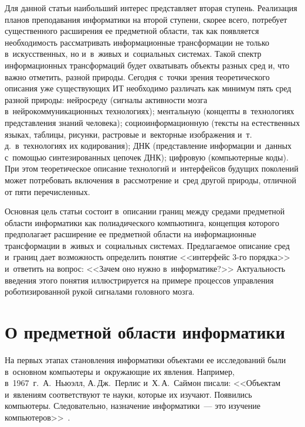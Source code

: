 \begin{multicols}{2}
  Для данной статьи наибольший интерес представляет вторая ступень. 
Реализация планов преподавания информатики на второй ступени, скорее 
всего, потребует существенного расширения ее предметной области, так как 
появляется необходимость рассматривать информационные трансформации не 
только в~искусственных, но и~в~живых и~социальных системах. Такой спектр 
информационных трансформаций будет охватывать объекты разных сред и, что 
важно отметить, разной природы. Сегодня с~точки зрения теоретического 
описания уже существующих ИТ необходимо 
различать как минимум пять сред разной природы: нейросреду (сигналы 
активности мозга в~нейрокоммуникационных технологиях); ментальную 
(концепты в~технологиях пред\-став\-ле\-ния знаний человека); 
социоинформационную (тексты на естественных языках, таблицы, рисунки, 
растровые и~векторные изображения и~т.\,д.\ в~технологиях их кодирования); 
ДНК (пред\-став\-ле\-ние информации и~данных с~по\-мощью синтезированных 
цепочек ДНК); циф\-ро\-вую (компьютерные коды). При этом тео\-ре\-ти\-че\-ское 
описание технологий и~интерфейсов будущих поколений может потребовать 
включения в~рас\-смот\-ре\-ние и~сред другой природы, отличной от пяти 
перечисленных.
  
  Основная цель статьи состоит в~описании границ между средами предметной 
области информатики как полиадического компьютинга, концепция которого 
предполагает расширение ее предметной области на информационные 
трансформации в~живых и~социальных системах. Предлагаемое описание сред 
и~границ дает возможность определить понятие <<интерфейс 3-го порядка>> 
и~ответить на вопрос: <<Зачем оно нужно в~информатике?>> Актуальность 
введения этого понятия иллюстрируется на примере процессов управ\-ле\-ния 
роботизированной рукой сигналами головного мозга.

\vspace*{-6pt}
  
\section{О предметной области информатики}

\vspace*{-4pt}
    
  На первых этапах становления информатики объектами ее исследований 
были в~основном компьютеры и~окружающие их явления. Например, в~1967~г.\ 
А.~Ньюэлл, А.\,Дж.~Перлис и~Х.\,А.~Саймон писали: <<Объектам и~явлениям 
соответствуют те науки, которые их изучают. Появились компьютеры. 
Следовательно, назначение информатики~--- это изучение 
компьютеров>>~\cite{7-zat}.
  

\end{multicols}
